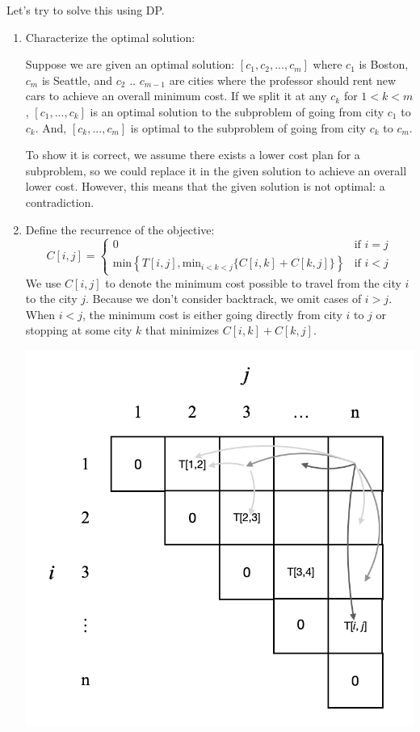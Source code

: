 \documentclass[11pt]{article}
\theoremstyle{definition}
\theoremstyle{theorem}
\begin{document}
Let's try to solve this using DP.
\begin{enumerate}[label=(\arabic*)]
\item Characterize the optimal solution:

Suppose we are given an optimal solution: $[c_1, c_2, ..., c_m]$ where $c_1$ is Boston, $c_m$ is Seattle, and $c_2$ .. $c_{m-1}$ are cities where the professor should rent new cars to achieve an overall minimum cost. If we split it at any $c_k$ for $1 < k < m$, $[c_1, ..., c_k]$ is an optimal solution to the subproblem of going from city $c_1$ to $c_k$. And, $[c_k, ..., c_m]$ is optimal to the subproblem of going from city $c_k$ to $c_m$. 

To show it is correct, we assume there exists a lower cost plan for a subproblem, so we could replace it in the given solution to achieve an overall lower cost. However, this means that the given solution is not optimal: a contradiction.

\item Define the recurrence of the objective:
\[
C[i, j] = 
\begin{cases}
  0 												&\mbox{if } i = j \\
  \text{min}\left\{T[i, j], \text{min}_{i < k < j} \{C[i, k] + C[k, j]\} \right\} 		&\mbox{if } i < j 
\end{cases}
\]
We use $C[i, j]$ to denote the minimum cost possible to travel from the city $i$ to the city $j$. Because we don't consider backtrack, we omit cases of $i > j$. When $i < j$, the minimum cost is either going directly from city $i$ to $j$ or stopping at some city $k$ that minimizes $C[i, k] + C[k, j]$. 
 
 \includegraphics[scale=0.65]{hw5q5.png}
 

\end{enumerate}
\end{document}
